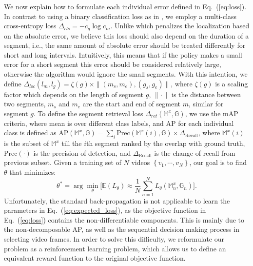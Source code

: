 \documentclass{bmvc2k}
\begin{document}
We now explain how to formulate each individual error defined in Eq.~(\ref{eq:loss}). In contrast to using a binary classification loss as in \cite{yeung2015end}, we employ a multi-class cross-entropy loss $\Delta_{cls} = - c_g \log {c_m}$. Unlike \cite{yeung2015end} which penalizes the localization based on the absolute error, we believe this loss should also depend on the duration of a segment, i.e., the same amount of absolute error should be treated differently for short and long intervals. Intuitively, this means that if the policy makes a small error for a short segment this error should be considered relatively large, otherwise the algorithm would ignore the small segments. With this intention, we define $\Delta_{loc} (l_m, l_g) = \zeta(g) \times \|(m_s, m_e), (g_s , g_e) \|$, where $\zeta(g)$ is a scaling factor which depends on the length of segment $g$, $\|\cdot\|$ is the distance between two segments, $m_s$ and $m_e$ are the start and end of segment $m$, similar for segment $g$. To define the segment retrieval loss $\Delta_{ret}(\mathbb{M}^x, \mathbb{G})$, we use the mAP criteria, where mean is over different class labels, and AP for each individual class is defined as $\text{AP}(\mathbb{M}^x, \mathbb{G}) =  \sum_i \text{Prec}(\mathbb{M}^x(i), \mathbb{G}) \times \Delta_\text{Recall}$, where $\mathbb{M}^x(i)$ is the subset of $\mathbb{M}^x$ till the $i$th segment ranked by the overlap with ground truth, $\text{Prec}(\cdot)$ is the precision of detection, and $\Delta_\text{Recall}$ is the change of recall from previous subset. Given a training set of $N$ videos $\left \{ v_1, \cdots, v_N \right \}$, our goal is to find $\theta$ that minimizes: 
\begin{equation}
\theta^* =\arg\min_{\theta} \big [\mathbb{E}(L_\theta) \approx \frac{1}{N}\sum_{n=1}^N L_\theta(\mathbb{M}^x_n, \mathbb{G}_n) \big].
\label{eq:expected_loss}
\end{equation}
\noindent Unfortunately, the standard back-propagation is not applicable to learn the parameters in Eq.~(\ref{eq:expected_loss}), as the objective function in Eq.~(\ref{eq:loss}) contains the non-differentiable components. This is mainly due to the non-decomposable AP, as well as the sequential decision making process in selecting video frames. In order to solve this difficulty, we reformulate our problem as a reinforcement learning problem, which allows us to define an equivalent reward function to the original objective function.

\end{document}
